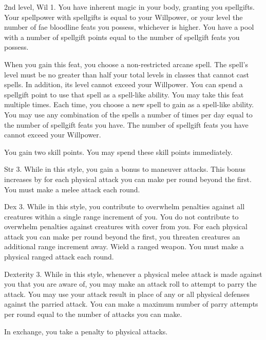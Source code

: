 \featpres 2nd level, Wil 1.
\featben You have inherent magic in your body, granting you spellgifts.
Your spellpower with spellgifts is equal to your Willpower, or your level \add the number of fae bloodline feats you possess, whichever is higher.
You have a pool with a number of spellgift points equal to the number of spellgift feats you possess.

When you gain this feat, you choose a non-restricted arcane spell.
The spell's level must be no greater than half your total levels in classes that cannot cast spells.
In addition, its level cannot exceed your Willpower.
You can spend a spellgift point to use that spell as a spell-like ability.
You may take this feat multiple times.
Each time, you choose a new spell to gain as a spell-like ability.
You may use any combination of the spells a number of times per day equal to the number of spellgift feats you have.
The number of spellgift feats you have cannot exceed your Willpower.

\featben You gain two skill points.
You may spend these skill points immediately.

\featpre Str 3.
\featben While in this style, you gain a  bonus to maneuver attacks.
This bonus increases by  for each physical attack you can make per round beyond the first.
\stylereq You must make a melee attack each round.

\featpre Dex 3.
\featben While in this style, you contribute to overwhelm penalties against all creatures within a single range increment of you.
You do not contribute to overwhelm penalties against creatures with cover from you.
For each physical attack you can make per round beyond the first, you threaten creatures an additional range increment away.
\stylereq Wield a ranged weapon.
You must make a physical ranged attack each round.

\featpre Dexterity 3.
\featben While in this style, whenever a physical melee attack is made against you that you are aware of, you may make an attack roll to attempt to parry the attack.
You may use your attack result in place of any or all physical defenses against the parried attack.
You can make a maximum number of parry attempts per round equal to the number of attacks you can make.

In exchange, you take a  penalty to physical attacks.


